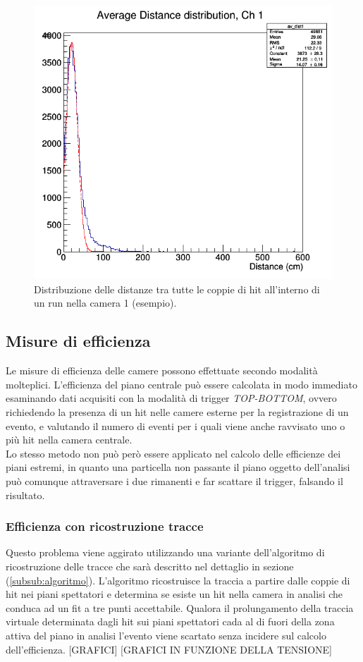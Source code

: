 \documentclass[8pt]{extarticle}
\begin{document}
\begin{figure}
\begin{center}
\includegraphics[scale=0.3]{dis_correlazione}
\caption{Distribuzione delle distanze tra tutte le coppie di hit all'interno di un run nella camera 1 (esempio).}
\label{fig:dis_correlazione}
\end{center}
\end{figure}


\subsection{Misure di efficienza}
Le misure di efficienza delle camere possono effettuate secondo modalità molteplici. L'efficienza del piano centrale può essere calcolata in modo immediato esaminando dati acquisiti con la modalità di trigger \textit{TOP-BOTTOM}, ovvero richiedendo la presenza di un hit nelle camere esterne per la registrazione di un evento, e valutando il numero di eventi per i quali viene anche ravvisato uno o più hit nella camera centrale. \\
Lo stesso metodo non può però essere applicato nel calcolo delle efficienze dei piani estremi, in quanto una particella non passante il piano oggetto dell'analisi può comunque attraversare i due rimanenti e far scattare il trigger, falsando il risultato.
\subsubsection{Efficienza con ricostruzione tracce}
Questo problema viene aggirato utilizzando una variante dell'algoritmo di ricostruzione delle tracce che sarà descritto nel dettaglio in sezione (\ref{subsub:algoritmo}). L'algoritmo ricostruisce la traccia a partire dalle coppie di hit nei piani spettatori e determina se esiste un hit nella camera in analisi che conduca ad un fit a tre punti accettabile. Qualora il prolungamento della traccia virtuale determinata dagli hit sui piani spettatori cada al di fuori della zona attiva del piano in analisi l'evento viene scartato senza incidere sul calcolo dell'efficienza.
[GRAFICI]
[GRAFICI IN FUNZIONE DELLA TENSIONE]
\end{document}
